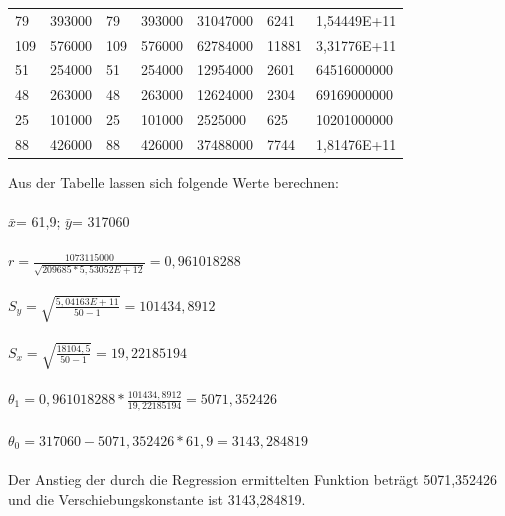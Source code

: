 \documentclass[a4paper]{scrreprt}
\begin{document}
\begin{enumerate}
\begin{table}
\begin{tiny}
\begin{tabular}{lllllll}
79                    & 393000                 & 79                  & 393000              & 31047000                                    & 6241                    & 1,54449E+11             \\
109                   & 576000                 & 109                 & 576000              & 62784000                                    & 11881                   & 3,31776E+11             \\
51                    & 254000                 & 51                  & 254000              & 12954000                                    & 2601                    & 64516000000             \\
48                    & 263000                 & 48                  & 263000              & 12624000                                    & 2304                    & 69169000000             \\
25                    & 101000                 & 25                  & 101000              & 2525000                                     & 625                     & 10201000000             \\
88                    & 426000                 & 88                  & 426000              & 37488000                                    & 7744                    & 1,81476E+11             \\
\bottomrule
\end{tabular}
\end{tiny}	
\end{table}
%
Aus der Tabelle lassen sich folgende Werte berechnen:\\\\
$\bar{x}$= 61,9; $\bar{y}$= 317060\\\\
$r= \frac{1073115000}{\sqrt{209685*5,53052E+12}}=0,961018288$\\\\
$S_{y}= \sqrt{\frac{5,04163 E+11}{50-1}}=101434,8912$\\\\
$S_{x}= \sqrt{\frac{18104,5}{50-1}}=19,22185194$\\\\
$\theta_{1}= 0,961018288*\frac{101434,8912}{19,22185194}=5071,352426$\\\\
$\theta_{0}=317060-5071,352426*61,9=3143,284819$\\\\
Der Anstieg der durch die Regression ermittelten Funktion beträgt 5071,352426 und die Verschiebungskonstante ist 3143,284819.

\end{enumerate}
\end{document}
